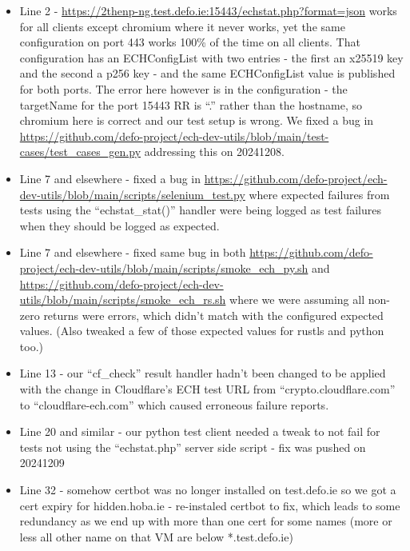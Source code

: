 \begin{itemize}

\item Line 2 -
    \url{https://2thenp-ng.test.defo.ie:15443/echstat.php?format=json} works
        for all clients except chromium where it never works, yet the same
        configuration on port 443 works 100\% of the time on all clients. That
        configuration has an ECHConfigList with two entries - the first an
        x25519 key and the second a p256 key - and the same ECHConfigList value
        is published for both ports. The error here however is in the
        configuration - the targetName for the port 15443 RR is ``.'' rather
        than the hostname, so chromium here is correct and our test setup is
        wrong. We fixed a bug in
        \url{https://github.com/defo-project/ech-dev-utils/blob/main/test-cases/test_cases_gen.py}
        addressing this on 20241208.\\

    \item Line 7 and elsewhere - fixed a bug in
        \url{https://github.com/defo-project/ech-dev-utils/blob/main/scripts/selenium_test.py}
        where expected failures from tests using the ``echstat\_stat()''
        handler were being logged as test failures when they should be logged
        as expected.

    \item Line 7 and elsewhere - fixed same bug in both
        \url{https://github.com/defo-project/ech-dev-utils/blob/main/scripts/smoke_ech_py.sh}
        and
        \url{https://github.com/defo-project/ech-dev-utils/blob/main/scripts/smoke_ech_rs.sh}
        where we were assuming all non-zero returns were errors, which didn't match with
        the configured expected values. (Also tweaked a few of those expected values for
        rustls and python too.)

    \item Line 13 - our ``cf\_check'' result handler hadn't been changed to be
        applied with the change in Cloudflare's ECH test URL from
        ``crypto.cloudflare.com'' to ``cloudflare-ech.com'' which caused
        erroneous failure reports.

    \item Line 20 and similar - our python test client needed a tweak to not
        fail for tests not using the ``echstat.php'' server side script - fix
        was pushed on 20241209

    \item Line 32 - somehow certbot was no longer installed on test.defo.ie so
        we got a cert expiry for hidden.hoba.ie - re-instaled certbot to fix,
        which leads to some redundancy as we end up with more than one cert for
        some names (more or less all other name on that VM are below
        *.test.defo.ie)


\end{itemize}
